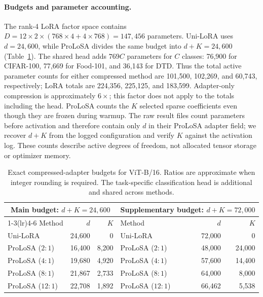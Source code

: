 \paragraph{Budgets and parameter accounting.}
The rank-4 LoRA factor space contains $D=12\times2\times(768\times4+4\times768)=147{,}456$ parameters. Uni-LoRA uses $d=24{,}600$, while ProLoSA divides the same budget into $d+K=24{,}600$ (Table~\ref{tab:vit_allocations}). The shared head adds $769C$ parameters for $C$ classes: 76,900 for CIFAR-100, 77,669 for Food-101, and 36,143 for DTD. Thus the total active parameter counts for either compressed method are 101,500, 102,269, and 60,743, respectively; LoRA totals are 224,356, 225,125, and 183,599. Adapter-only compression is approximately $6\times$; this factor does not apply to the totals including the head. ProLoSA counts the $K$ selected sparse coefficients even though they are frozen during warmup. The raw result files count parameters before activation and therefore contain only $d$ in their ProLoSA adapter field; we recover $d+K$ from the logged configuration and verify $K$ against the activation log. These counts describe active degrees of freedom, not allocated tensor storage or optimizer memory.

\begin{table}[t]
\centering\small
\begin{tabular}{lrr@{\qquad}lrr}
\toprule
\multicolumn{3}{c}{Main budget: $d+K=24{,}600$} & \multicolumn{3}{c}{Supplementary budget: $d+K=72{,}000$} \\
\cmidrule(lr){1-3}\cmidrule(lr){4-6}
Method & $d$ & $K$ & Method & $d$ & $K$ \\
\midrule
Uni-LoRA & 24,600 & 0 & Uni-LoRA & 72,000 & 0 \\
ProLoSA ($2:1$) & 16,400 & 8,200 & ProLoSA ($2:1$) & 48,000 & 24,000 \\
ProLoSA ($4:1$) & 19,680 & 4,920 & ProLoSA ($4:1$) & 57,600 & 14,400 \\
ProLoSA ($8:1$) & 21,867 & 2,733 & ProLoSA ($8:1$) & 64,000 & 8,000 \\
ProLoSA ($12:1$) & 22,708 & 1,892 & ProLoSA ($12:1$) & 66,462 & 5,538 \\
\bottomrule
\end{tabular}
\caption{Exact compressed-adapter budgets for ViT-B/16. Ratios are approximate when integer rounding is required. The task-specific classification head is additional and shared across methods.}
\label{tab:vit_allocations}
\end{table}

